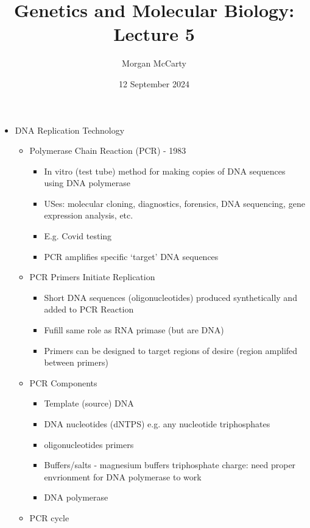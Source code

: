 \documentclass[12pt]{article}
\title{
    Genetics and Molecular Biology: Lecture 5}
\author{Morgan McCarty}
\date{12 September 2024}
\begin{document}
    \maketitle
    \begin{itemize}
        \item DNA Replication Technology
        \begin{itemize}
            \item Polymerase Chain Reaction (PCR) - 1983
            \begin{itemize}
                \item In vitro (test tube) method for making copies of DNA sequences using DNA polymerase
                \item USes: molecular cloning, diagnostics, forensics, DNA sequencing, gene expression analysis, etc.
                \item E.g. Covid testing
                \item PCR amplifies specific `target' DNA sequences
            \end{itemize}
            \item PCR Primers Initiate Replication
            \begin{itemize}
                \item Short DNA sequences (oligonucleotides) produced synthetically and added to PCR Reaction
                \item Fufill same role as RNA primase (but are DNA)
                \item Primers can be designed to target regions of desire (region amplifed between primers)
            \end{itemize}
            \item PCR Components
            \begin{itemize}
                \item Template (source) DNA
                \item DNA nucleotides (dNTPS) e.g. any nucleotide triphosphates
                \item oligonucleotides primers
                \item Buffers/salts - magnesium buffers triphosphate charge: need proper envrionment for DNA polymerase to work
                \item DNA polymerase
            \end{itemize}
            \item PCR cycle
            \begin{enumerate}

\end{enumerate}
\end{itemize}
\end{itemize}
\end{document}
